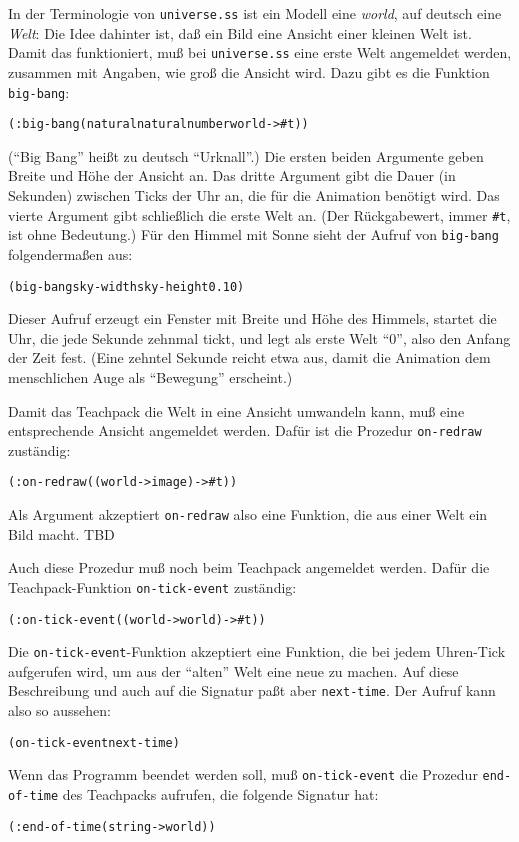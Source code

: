 In der Terminologie von \texttt{universe.ss} ist ein Modell eine
\textit{world}, auf deutsch eine \textit{Welt}: Die Idee dahinter
ist, daß ein Bild eine Ansicht einer kleinen Welt ist.  Damit das
funktioniert, muß bei \texttt{universe.ss} eine erste Welt angemeldet
werden, zusammen mit Angaben, wie groß die Ansicht wird.  Dazu gibt es
die Funktion \texttt{big-bang}:
%
\begin{alltt}
(: big-bang (natural natural number world -> #t))
\end{alltt}
%
("`Big Bang"' heißt zu deutsch "`Urknall"'.)
Die ersten beiden Argumente geben Breite und Höhe der Ansicht an.  Das
dritte Argument gibt die Dauer (in Sekunden) zwischen Ticks der Uhr
an, die für die Animation benötigt wird.  Das vierte Argument gibt
schließlich die erste Welt an.  (Der Rückgabewert, immer
\verb|#t|, ist ohne Bedeutung.)  Für den Himmel mit
Sonne sieht der Aufruf von \texttt{big-bang} folgendermaßen aus:
%
\begin{alltt}
(big-bang sky-width sky-height 0.1 0)
\end{alltt}
%
Dieser Aufruf erzeugt ein Fenster mit Breite und Höhe des Himmels,
startet die Uhr, die jede Sekunde zehnmal tickt, und legt als erste
Welt "`0"', also den Anfang der Zeit fest.  (Eine zehntel Sekunde
reicht etwa aus, damit die Animation dem menschlichen Auge als
"`Bewegung"' erscheint.)

Damit das Teachpack die Welt in eine Ansicht umwandeln kann, muß eine
entsprechende Ansicht angemeldet werden.  Dafür ist die Prozedur
\texttt{on-redraw} zuständig:
%
\begin{alltt}
(: on-redraw ((world -> image) -> #t))
\end{alltt}
%
Als Argument akzeptiert \texttt{on-redraw} also eine Funktion, die aus
einer Welt ein Bild macht.  TBD

Auch diese Prozedur muß noch beim Teachpack angemeldet werden.  Dafür
die Teachpack-Funktion
\texttt{on-tick-event}
zuständig:
%
\begin{alltt}
(: on-tick-event ((world -> world) -> #t))
\end{alltt}
%
Die \texttt{on-tick-event}-Funktion akzeptiert eine Funktion, die bei
jedem Uhren-Tick aufgerufen wird, um aus der "`alten"' Welt eine neue
zu machen.  Auf diese Beschreibung und auch auf die Signatur
paßt aber \texttt{next-time}.  Der Aufruf kann also so aussehen:
%
\begin{alltt}
(on-tick-event next-time)
\end{alltt}
%
Wenn das Programm
beendet werden soll, muß \texttt{on-tick-event} die Prozedur
\texttt{end-of-time} des
Teachpacks aufrufen, die folgende Signatur hat:
%
\begin{alltt}
(: end-of-time (string -> world))
\end{alltt}
%

